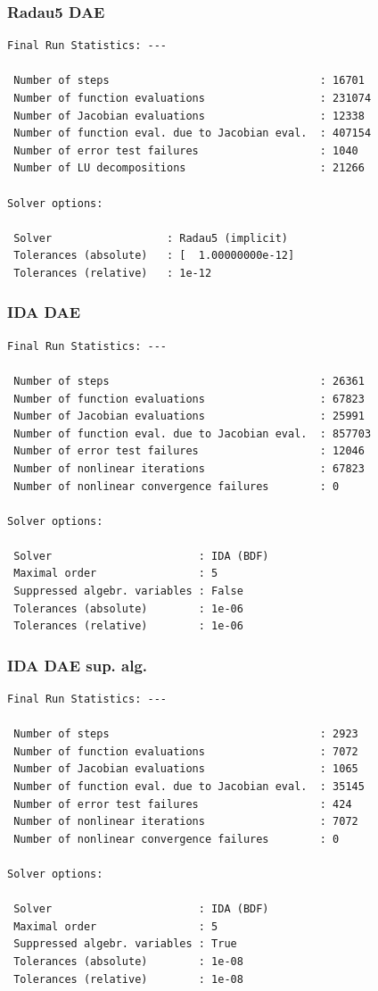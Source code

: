 \documentclass[]{beamer}
\begin{document}
\begin{frame}[fragile]
\frametitle{Radau5 DAE}
{\small
\begin{verbatim}
Final Run Statistics: --- 

 Number of steps                                 : 16701
 Number of function evaluations                  : 231074
 Number of Jacobian evaluations                  : 12338
 Number of function eval. due to Jacobian eval.  : 407154
 Number of error test failures                   : 1040
 Number of LU decompositions                     : 21266

Solver options:

 Solver                  : Radau5 (implicit)
 Tolerances (absolute)   : [  1.00000000e-12]
 Tolerances (relative)   : 1e-12
\end{verbatim}
}
\end{frame}

\begin{frame}[fragile]
\frametitle{IDA DAE}
{\small
\begin{verbatim}
Final Run Statistics: --- 

 Number of steps                                 : 26361
 Number of function evaluations                  : 67823
 Number of Jacobian evaluations                  : 25991
 Number of function eval. due to Jacobian eval.  : 857703
 Number of error test failures                   : 12046
 Number of nonlinear iterations                  : 67823
 Number of nonlinear convergence failures        : 0

Solver options:

 Solver                       : IDA (BDF)
 Maximal order                : 5
 Suppressed algebr. variables : False
 Tolerances (absolute)        : 1e-06
 Tolerances (relative)        : 1e-06
\end{verbatim}
}
\end{frame}

\begin{frame}[fragile]
\frametitle{IDA DAE sup. alg.}
{\small
\begin{verbatim}
Final Run Statistics: --- 

 Number of steps                                 : 2923
 Number of function evaluations                  : 7072
 Number of Jacobian evaluations                  : 1065
 Number of function eval. due to Jacobian eval.  : 35145
 Number of error test failures                   : 424
 Number of nonlinear iterations                  : 7072
 Number of nonlinear convergence failures        : 0

Solver options:

 Solver                       : IDA (BDF)
 Maximal order                : 5
 Suppressed algebr. variables : True
 Tolerances (absolute)        : 1e-08
 Tolerances (relative)        : 1e-08
\end{verbatim}
}
\end{frame}
\end{document}
